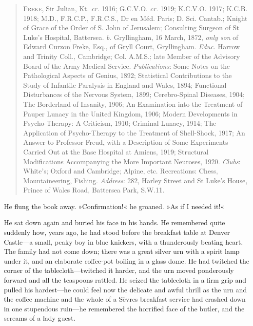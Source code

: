 \begin{quote}
\textsc{Freke}, Sir Julian, Kt. \textit{cr.} 1916; G.C.V.O. \textit{cr.} 1919; K.C.V.O. 1917; K.C.B. 1918; M.D., F.R.C.P., F.R.C.S., Dr en Méd. Paris; D. Sci. Cantab.; Knight of Grace of the Order of S. John of Jerusalem; Consulting Surgeon of St Luke's Hospital, Battersea. \textit{b.} Gryllingham, 16 March, 1872, \textit{only son} of Edward Curzon Freke, Esq., of Gryll Court, Gryllingham. \textit{Educ.} Harrow and Trinity Coll., Cambridge; Col. A.M.S.; late Member of the Advisory Board of the Army Medical Service. \textit{Publications}: Some Notes on the Pathological Aspects of Genius, 1892; Statistical Contributions to the Study of Infantile Paralysis in England and Wales, 1894; Functional Disturbances of the Nervous System, 1899; Cerebro-Spinal Diseases, 1904; The Borderland of Insanity, 1906; An Examination into the Treatment of Pauper Lunacy in the United Kingdom, 1906; Modern Developments in Psycho-Therapy: A Criticism, 1910; Criminal Lunacy, 1914; The Application of Psycho-Therapy to the Treatment of Shell-Shock, 1917; An Answer to Professor Freud, with a Description of Some Experiments Carried Out at the Base Hospital at Amiens, 1919; Structural Modifications Accompanying the More Important Neuroses, 1920. \textit{Clubs}: White's; Oxford and Cambridge; Alpine, etc. Recreations: Chess, Mountaineering, Fishing. \textit{Address}: 282, Harley Street and St Luke's House, Prince of Wales Road, Battersea Park, S.W.11.
\end{quote}

He flung the book away. »Confirmation!« he groaned. »As if I needed it!«

He sat down again and buried his face in his hands. He remembered quite suddenly how, years ago, he had stood before the breakfast table at Denver Castle\allowbreak---\allowbreak a small, peaky boy in blue knickers, with a thunderously beating heart. The family had not come down; there was a great silver urn with a spirit lamp under it, and an elaborate coffee-pot boiling in a glass dome. He had twitched the corner of the tablecloth\allowbreak---\allowbreak twitched it harder, and the urn moved ponderously forward and all the teaspoons rattled. He seized the tablecloth in a firm grip and pulled his hardest\allowbreak---\allowbreak he could feel now the delicate and awful thrill as the urn and the coffee machine and the whole of a Sèvres breakfast service had crashed down in one stupendous ruin\allowbreak---\allowbreak he remembered the horrified face of the butler, and the screams of a lady guest.

